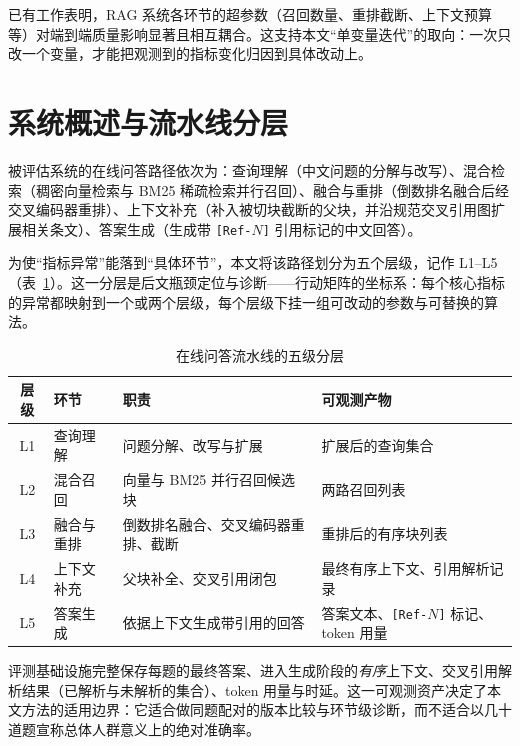 \documentclass[11pt,a4paper,fontset=fandol]{ctexart}
\begin{document}
已有工作表明，RAG 系统各环节的超参数（召回数量、重排截断、上下文预算等）对端到端质量影响显著且相互耦合\cite{wang2024best,ammar2025hyper}。这支持本文``单变量迭代''的取向：一次只改一个变量，才能把观测到的指标变化归因到具体改动上。

\section{系统概述与流水线分层}
\label{sec:system}

被评估系统的在线问答路径依次为：查询理解（中文问题的分解与改写）、混合检索（稠密向量检索\cite{dpr}与 BM25 稀疏检索\cite{bm25}并行召回）、融合与重排（倒数排名融合后经交叉编码器重排\cite{monobert,nogueira2019}）、上下文补充（补入被切块截断的父块，并沿规范交叉引用图扩展相关条文）、答案生成（生成带 \texttt{[Ref-$N$]} 引用标记的中文回答）。

为使``指标异常''能落到``具体环节''，本文将该路径划分为五个层级，记作 L1--L5（表~\ref{tab:stages}）。这一分层是后文瓶颈定位与诊断——行动矩阵的坐标系：每个核心指标的异常都映射到一个或两个层级，每个层级下挂一组可改动的参数与可替换的算法。

\begin{table}[!htbp]
\centering\small
\caption{在线问答流水线的五级分层}\label{tab:stages}
\begin{tabularx}{\textwidth}{@{}clXX@{}}
\toprule
层级 & 环节 & 职责 & 可观测产物 \\
\midrule
L1 & 查询理解 & 问题分解、改写与扩展 & 扩展后的查询集合 \\
L2 & 混合召回 & 向量与 BM25 并行召回候选块 & 两路召回列表 \\
L3 & 融合与重排 & 倒数排名融合、交叉编码器重排、截断 & 重排后的有序块列表 \\
L4 & 上下文补充 & 父块补全、交叉引用闭包 & 最终有序上下文、引用解析记录 \\
L5 & 答案生成 & 依据上下文生成带引用的回答 & 答案文本、\texttt{[Ref-$N$]} 标记、token 用量 \\
\bottomrule
\end{tabularx}
\end{table}

评测基础设施完整保存每题的最终答案、进入生成阶段的\emph{有序}上下文、交叉引用解析结果（已解析与未解析的集合）、token 用量与时延。这一可观测资产决定了本文方法的适用边界：它适合做同题配对的版本比较与环节级诊断，而不适合以几十道题宣称总体人群意义上的绝对准确率。
\end{document}
